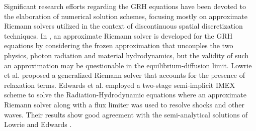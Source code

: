 \documentclass[times,doublespace]{fldauth}%
\begin{document}
%
Significant research efforts regarding the GRH equations have been devoted to the elaboration of numerical solution schemes, focusing mostly on approximate Riemann solvers utilized in the context of discontinuous spatial discretization techniques.
In \cite{Balsara}, an approximate Riemann solver is developed for the GRH equations by considering the frozen approximation that uncouples the two physics, photon radiation and material hydrodynamics, but the validity of such an approximation may be questionable in the equilibrium-diffusion limit.
Lowrie et al. \cite{LowrieMorelHittinger} proposed a generalized Riemann solver that accounts for the presence of relaxation terms.
Edwards et al. \cite{EdwardsMorelLowrie} employed a two-stage semi-implicit IMEX scheme to solve the Radiation-Hydrodynamic equations where an approximate Riemann solver along with a flux limiter was used to resolve shocks and other waves. 
Their results show good agreement with the semi-analytical solutions of Lowrie and Edwards \cite{LowrieEdwards} .
%
%
\end{document}
